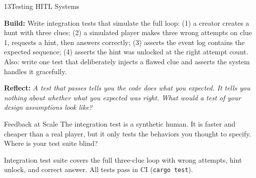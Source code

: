 \documentclass[
  11pt,
  oneside,
  DIV=12,
]{scrartcl}
\newcommand{\build}[1]{\textbf{\color{SpringMoss}Build:} #1}
\newcommand{\reflect}[1]{\textbf{\color{ConceptBlue}Reflect:} \textit{#1}}
\begin{document}
\begin{milestone}{13}{Testing HITL Systems}

\build{Write integration tests that simulate the full loop:
(1) a creator creates a hunt with three clues;
(2) a simulated player makes three wrong attempts on clue 1, requests a hint,
then answers correctly;
(3) asserts the event log contains the expected sequence;
(4) asserts the hint was unlocked at the right attempt count.
Also: write one test that deliberately injects a flawed clue and asserts
the system handles it gracefully.}

\medskip
\reflect{A test that passes tells you the code does what you expected.
It tells you nothing about whether what you expected was right.
What would a test of your \emph{design assumptions} look like?}

\begin{hitlconcept}{Feedback at Scale}
  The integration test is a synthetic human. It is faster and cheaper than
  a real player, but it only tests the behaviors you thought to specify.
  Where is your test suite blind?
\end{hitlconcept}

\begin{checkpoint}
  Integration test suite covers the full three-clue loop with wrong
  attempts, hint unlock, and correct answer. All tests pass in CI
  (\texttt{cargo test}).
\end{checkpoint}

\end{milestone}
\end{document}

